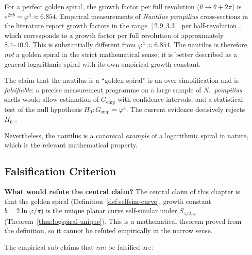 \begin{remark}
\label{rem:nautilus-falsify}
For a perfect golden spiral, the growth factor per full revolution
(\(\theta \to \theta + 2\pi\)) is \(e^{2\pi b} = \varphi^4 \approx 6.854\).
Empirical measurements of \textit{Nautilus pompilius} cross-sections
in the literature report growth factors in the range
\([2.9, 3.3]\) per half-revolution \cite{livio_phi}, which corresponds
to a growth factor per full revolution of approximately \(8.4\text{--}10.9\).
This is substantially different from \(\varphi^4 \approx 6.854\).
The nautilus is therefore \emph{not} a golden spiral in the strict
mathematical sense; it is better described as a general logarithmic
spiral with its own empirical growth constant.

The claim that the nautilus is a ``golden spiral'' is an
over-simplification and is \emph{falsifiable}: a precise measurement
programme on a large sample of \textit{N.\ pompilius} shells
would allow estimation of \(G_{\text{emp}}\) with confidence
intervals, and a statistical test of the null hypothesis
\(H_0: G_{\text{emp}} = \varphi^4\).  The current evidence
decisively rejects \(H_0\) \cite{livio_phi}.

Nevertheless, the nautilus is a canonical \emph{example} of a
logarithmic spiral in nature, which is the relevant mathematical
property.
\end{remark}

\subsection{Falsification Criterion}
\label{sec:17-falsification}

\textbf{What would refute the central claim?}  The central claim
of this chapter is that the golden spiral (Definition~\ref{def:selfsim-curve},
growth constant \(b = 2\ln\varphi/\pi\)) is the unique planar
curve self-similar under \(S_{\pi/2,\varphi}\) (Theorem~\ref{thm:logspiral-unique}).
This is a mathematical theorem proved from the definition, so
it cannot be refuted empirically in the narrow sense.

The empirical sub-claims that \emph{can} be falsified are:

